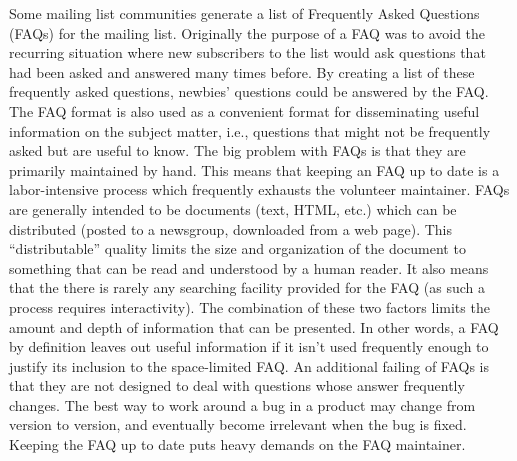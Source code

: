 Some mailing list communities generate a list of Frequently Asked Questions
(FAQs) for the mailing list. Originally the purpose of a FAQ was to avoid the
recurring situation where new subscribers to the list would ask questions that
had been asked and answered many times before. By creating a list of these
frequently asked questions, newbies' questions could be answered by the FAQ.
The FAQ format is also used as a convenient format for disseminating useful
information on the subject matter, i.e., questions that might not be frequently
asked but are useful to know. The big problem with FAQs is that they are
primarily maintained by hand. This means that keeping an FAQ up to date is a
labor-intensive process which frequently exhausts the volunteer maintainer.
FAQs are generally intended to be documents (text, HTML, etc.) which can be
distributed (posted to a newsgroup, downloaded from a web page). This
``distributable'' quality limits the size and organization of the document to
something that can be read and understood by a human reader. It also means that
the there is rarely any searching facility provided for the FAQ (as such a
process requires interactivity). The combination of these two factors limits
the amount and depth of information that can be presented. In other words, a
FAQ by definition leaves out useful information if it isn't used frequently
enough to justify its inclusion to the space-limited FAQ.  An additional
failing of FAQs is that they are not designed to deal with questions whose
answer frequently changes. The best way to work around a bug in a product may
change from version to version, and eventually become irrelevant when the bug
is fixed. Keeping the FAQ up to date puts heavy demands on the FAQ maintainer.

